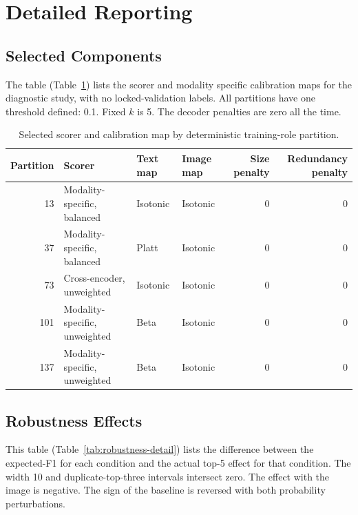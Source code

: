 \section{Detailed Reporting}
\label{sec:appendix}

\subsection{Selected Components}

The table (Table~\ref{tab:selected-components}) lists the scorer and modality specific calibration maps for the diagnostic study, with no locked-validation labels. All partitions have one threshold defined: 0.1. Fixed $k$ is 5. The decoder penalties are zero all the time.

\begin{table}[!t]
\centering
\caption{Selected scorer and calibration map by deterministic training-role partition.}
\label{tab:selected-components}
\small
\begin{tabular}{rlllrr}
\toprule
Partition & Scorer & Text map & Image map & Size penalty & Redundancy penalty \\
\midrule
13  & Modality-specific, balanced & Isotonic & Isotonic & 0 & 0 \\
37  & Modality-specific, balanced & Platt & Isotonic & 0 & 0 \\
73  & Cross-encoder, unweighted & Isotonic & Isotonic & 0 & 0 \\
101 & Modality-specific, unweighted & Beta & Isotonic & 0 & 0 \\
137 & Modality-specific, unweighted & Beta & Isotonic & 0 & 0 \\
\bottomrule
\end{tabular}
\end{table}

\subsection{Robustness Effects}

This table (Table~\ref{tab:robustness-detail}) lists the difference between the expected-F1 for each condition and the actual top-5 effect for that condition. The width 10 and duplicate-top-three intervals intersect zero. The effect with the image is negative. The sign of the baseline is reversed with both probability perturbations.

\begin{table}[!t]
\centering
\caption{Expected-F1 minus fixed top-5 under controlled perturbations. Intervals are claim-aligned and descriptive.}
\label{tab:robustness-detail}

\end{table}

